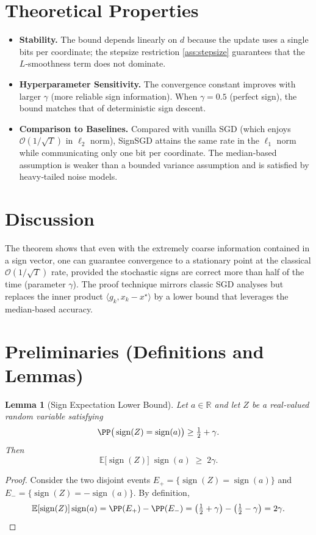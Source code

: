 \documentclass[11pt]{article}
\newtheorem{lemma}{Lemma}
\newcommand{\sign}{\operatorname{sign}}
\newcommand{\EE}{\mathbb{E}}
\newcommand{\RR}{\mathbb{R}}
\begin{document}
\section*{Theoretical Properties}
\begin{itemize}
\item \textbf{Stability.} The bound depends linearly on $d$ because the update uses a single bits per coordinate; the stepsize restriction \eqref{ass:stepsize} guarantees that the $L$‑smoothness term does not dominate.
\item \textbf{Hyperparameter Sensitivity.} The convergence constant improves with larger $\gamma$ (more reliable sign information). When $\gamma=0.5$ (perfect sign), the bound matches that of deterministic sign descent.
\item \textbf{Comparison to Baselines.} Compared with vanilla SGD (which enjoys $\mathcal O(1/\sqrt{T})$ in $\ell_{2}$ norm), SignSGD attains the same rate in the $\ell_{1}$ norm while communicating only one bit per coordinate. The median‑based assumption is weaker than a bounded variance assumption and is satisfied by heavy‑tailed noise models.
\end{itemize}

\section*{Discussion}
The theorem shows that even with the extremely coarse information contained in a sign vector, one can guarantee convergence to a stationary point at the classical $\mathcal O(1/\sqrt{T})$ rate, provided the stochastic signs are correct more than half of the time (parameter $\gamma$). The proof technique mirrors classic SGD analyses but replaces the inner product $\langle g_{k},x_{k}-x^{\star}\rangle$ by a lower bound that leverages the median‑based accuracy.

\newpage
\section*{Preliminaries (Definitions and Lemmas)}
\begin{lemma}[Sign Expectation Lower Bound]\label{lem:signlb}
Let $a\in\RR$ and let $Z$ be a real‑valued random variable satisfying
\[
\PP\big(\sign(Z)=\sign(a)\big)\ge \tfrac12+\gamma .
\]
Then
\[
\EE\!\big[\sign(Z)\big]\;\sign(a)\;\ge\;2\gamma .
\]
\end{lemma}
\begin{proof}
Consider the two disjoint events $E_{+}=\{\sign(Z)=\sign(a)\}$ and $E_{-}=\{\sign(Z)=-\sign(a)\}$. By definition,
\[
\EE[\sign(Z)]\sign(a)=\PP(E_{+})-\PP(E_{-})
= \big(\tfrac12+\gamma\big)-\big(\tfrac12-\gamma\big)=2\gamma .
\]
\end{proof}
\end{document}
